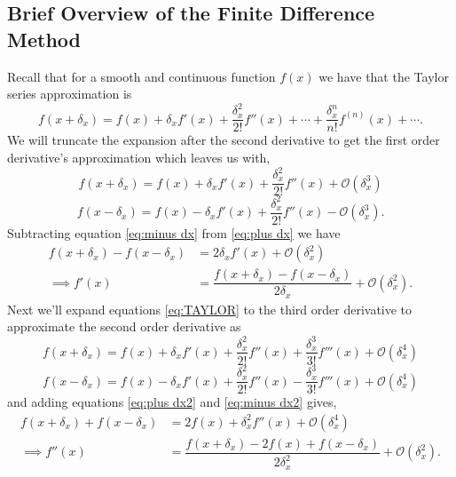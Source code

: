 \documentclass[11pt,letterpaper]{article}
\begin{document}
\subsection{Brief Overview of the Finite Difference Method}
Recall that for a smooth and continuous function $f(x)$ we have that the Taylor series approximation is
\begin{equation}\label{eq:TAYLOR}
    f(x+\delta_x) = f(x) +\delta_xf'(x) + \dfrac{\delta^2_x}{2!}f''(x) + \cdots + \dfrac{\delta^n_x}{n!}f^{(n)}(x) + \cdots.
\end{equation}
We will truncate the expansion after the second derivative to get the first order derivative's approximation which leaves us with,
\begin{equation}\label{eq:plus dx}
    f(x+\delta_x) = f(x) +\delta_xf'(x) + \dfrac{\delta^2_x}{2!}f''(x) + \mathcal{O}(\delta_x^3)    
\end{equation}
\begin{equation}\label{eq:minus dx}
    f(x-\delta_x) = f(x) -\delta_xf'(x) + \dfrac{\delta^2_x}{2!}f''(x) - \mathcal{O}(\delta_x^3).    
\end{equation}
Subtracting equation \eqref{eq:minus dx} from \eqref{eq:plus dx} we have 
\begin{align}
    f(x+\delta_x) - f(x-\delta_x) &= 2\delta_xf'(x) + \mathcal{O}(\delta_x^2) \nonumber \\
    \implies f'(x) &= \dfrac{f(x+\delta_x)-f(x-\delta_x)}{2\delta_x}+\mathcal{O}(\delta_x^2).
\end{align}
Next we'll expand equations \eqref{eq:TAYLOR} to the third order derivative to approximate the second order derivative as
\begin{equation}\label{eq:plus dx2}
    f(x+\delta_x) = f(x) +\delta_xf'(x) + \dfrac{\delta^2_x}{2!}f''(x) + \dfrac{\delta^3_x}{3!}f'''(x)+ \mathcal{O}(\delta_x^4) 
\end{equation}
\begin{equation}\label{eq:minus dx2}
    f(x-\delta_x) = f(x) -\delta_xf'(x) + \dfrac{\delta^2_x}{2!}f''(x) - \dfrac{\delta^3_x}{3!}f'''(x)+ \mathcal{O}(\delta_x^4)
\end{equation}
and adding equations \eqref{eq:plus dx2} and \eqref{eq:minus dx2} gives,
\begin{align}
    f(x+\delta_x) + f(x-\delta_x) &= 2f(x)+ \delta_x^2f''(x) + \mathcal{O}(\delta_x^4) \nonumber \\
    \implies f''(x) &= \dfrac{f(x+\delta_x)-2f(x)+f(x-\delta_x)}{2\delta_x^2}+\mathcal{O}(\delta_x^2).
\end{align}
\end{document}
